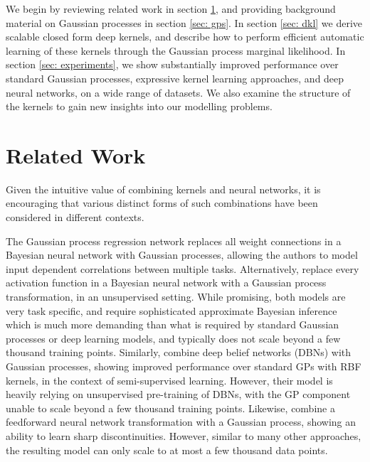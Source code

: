 \documentclass[twoside,11pt]{article}
\begin{document}
We begin by reviewing related work in section \ref{sec: related}, and
providing background
material on Gaussian processes in section \ref{sec: gps}.  In section \ref{sec: dkl} we derive scalable closed form
deep kernels, and describe how to perform efficient automatic learning of these kernels through the Gaussian
process marginal likelihood.  In section \ref{sec: experiments}, we show substantially improved performance
over standard Gaussian processes, expressive kernel learning approaches, and deep neural networks, on
a wide range of datasets. 
We also examine the structure of the kernels
to gain new insights into our modelling problems.



\section{Related Work}
\label{sec: related}
Given the intuitive value of combining kernels and neural networks,
it is encouraging that various
distinct forms of such combinations have been considered in different
contexts.

The Gaussian process regression network \citep{wilson12icml} replaces
all weight connections in a Bayesian neural network with Gaussian
processes, allowing the authors to model input
dependent correlations between multiple tasks.
Alternatively, \citet{damianou2013deep} replace every activation
function in a Bayesian neural network with a Gaussian process transformation, in an
unsupervised setting.  While promising, both models are very task specific,
and require sophisticated approximate Bayesian
inference which is much more demanding than what is required by
standard Gaussian processes or deep learning models, and typically does not
scale beyond a few thousand training points.  Similarly, \citet{salakhutdinov2008}
combine deep belief networks (DBNs) with Gaussian processes, showing improved performance
over standard GPs with RBF kernels, in the context of semi-supervised learning.  However,
their model is heavily relying on unsupervised pre-training of DBNs, with
the GP component unable to scale beyond a few thousand training points.  Likewise,
\citet{calandra2014manifold} combine a feedforward neural network transformation with a
Gaussian process, showing an ability to learn sharp discontinuities.
However, similar to many other approaches, the resulting model
can only scale to at most a few thousand data points.
\end{document}

